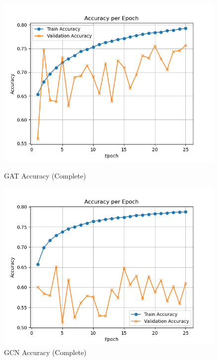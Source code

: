\documentclass{article}
\begin{document}
\begin{figure}[h]
    \centering
    \begin{minipage}{0.32\textwidth}
        \centering
        \includegraphics[width=\textwidth]{gat_acc.png}
        \caption{GAT Accuracy (Complete)}
        \label{fig:gat_acc}
    \end{minipage}
    \hfill
    \begin{minipage}{0.32\textwidth}
        \centering
        \includegraphics[width=\textwidth]{gcn_acc.png}
        \caption{GCN Accuracy (Complete)}
        \label{fig:gcn_acc}
    \end{minipage}
    \hfill
    \begin{minipage}{0.32\textwidth}
        \centering

\end{minipage}
\end{figure}
\end{document}
